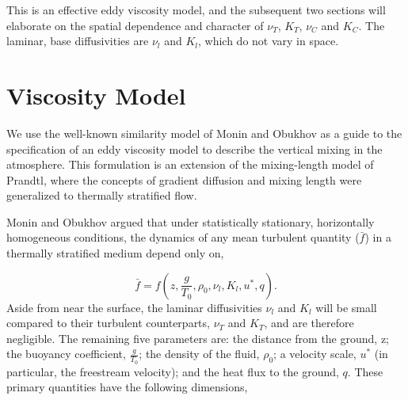 This is an effective eddy viscosity model\cite{boussinesq1887}, and the
subsequent two sections will elaborate on the spatial dependence and
character of $\nu_T$, $K_T$, $\nu_C$ and $K_C$. The laminar, base
diffusivities are $\nu_l$ and $K_l$, which do not vary in space.  

\section{Viscosity Model}

We use the well-known similarity model of Monin and
Obukhov\cite{monin2007statistical,monin1954basic,1990JFM...212..637K} as
a guide to the specification of an eddy viscosity model to describe the
vertical mixing in the atmosphere. This formulation is an extension of
the mixing-length model of Prandtl, where the concepts of gradient
diffusion and mixing length were generalized to thermally stratified
flow.    

%
%

Monin and Obukhov argued that under statistically stationary, horizontally
homogeneous conditions, the dynamics of any mean turbulent quantity
($\bar f$) in a thermally stratified medium depend only on,  

\begin{equation}
\bar f = f(z,\frac{g}{T_0},\rho_0,\nu_l,K_l,u^*,q).
\end{equation}
Aside from near the surface, the laminar diffusivities $\nu_l$ 
and $K_l$ will be  
small compared to their turbulent counterparts, $\nu_T$ and $K_T$, and 
are therefore negligible. 
The remaining five parameters are: the distance from the ground, z; the
buoyancy coefficient, $\frac{g}{T_0}$; the density of the fluid,
$\rho_0$; a velocity scale, $u^*$ (in particular, the freestream
velocity); and the heat flux to the ground, $q$. %
%
% 
These primary quantities have the following dimensions,

